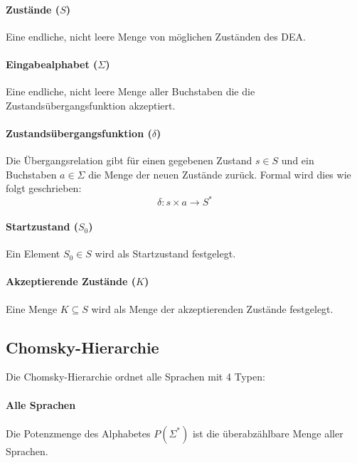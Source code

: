 \documentclass[../main.tex]{subfiles}
\begin{document}
            \paragraph{Zustände ($S$)} Eine endliche, nicht leere Menge von möglichen Zuständen des DEA.
            
            \paragraph{Eingabealphabet ($\Sigma$)} Eine endliche, nicht leere Menge aller Buchstaben die die Zustandsübergangsfunktion akzeptiert.
            
            \paragraph{Zustandsübergangsfunktion ($\delta$)} Die Übergangsrelation gibt für einen gegebenen Zustand $s \in S$ und ein Buchstaben $a \in \Sigma$ die Menge der neuen Zustände zurück. Formal wird dies wie folgt geschrieben:
            	\begin{equation}
            	    \delta: s \times a \rightarrow S^*
            	\end{equation}
            	
        	\paragraph{Startzustand ($S_0$)}
                Ein Element $S_0 \in S$ wird als Startzustand festgelegt.
                
    	\paragraph{Akzeptierende Zustände ($K$)}
    	    Eine Menge $K \subseteq S$ wird als Menge der akzeptierenden Zustände festgelegt.
    	    
                    
        \subsection{Chomsky-Hierarchie}
            Die Chomsky-Hierarchie ordnet alle Sprachen mit 4 Typen:
            
            \paragraph{Alle Sprachen}
                Die Potenzmenge des Alphabetes $P(\Sigma^*)$ ist die überabzählbare Menge aller Sprachen.
            
\end{document}
